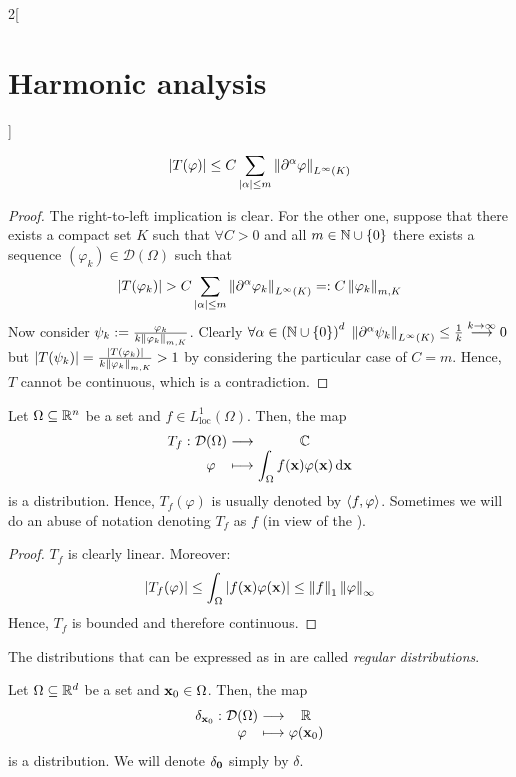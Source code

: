\documentclass[../../../main_math.tex]{subfiles}
\begin{document}
\begin{multicols}{2}[\section{Harmonic analysis}]
\begin{proposition}
    $$\abs{T(\varphi)}\leq C\sum_{\abs{\alpha}\leq m}\left\|\partial^\alpha\varphi\right\|_{L^\infty(K)}$$
  \end{proposition}
  \begin{proof}
    The right-to-left implication is clear. For the other one, suppose that there exists a compact set $K$ such that $\forall C>0$ and all $m\in\mathbb{N}\cup\{0\}$ there exists a sequence $(\varphi_k)\in\mathcal{D}(\Omega)$ such that
    $$\abs{T(\varphi_k)}> C\sum_{\abs{\alpha}\leq m}\left\|\partial^\alpha\varphi_k\right\|_{L^\infty(K)}=:C\left\|\varphi_k\right\|_{m,K}$$
    Now consider $\psi_k:=\frac{\varphi_k}{k\left\|\varphi_k\right\|_{m,K}}$. Clearly $\forall \alpha\in {(\ensuremath{\mathbb{N}}\cup\{0\})}^d$ $\left\|\partial^\alpha\psi_k\right\|_{L^\infty(K)}\leq\frac{1}{k}\overset{k\to\infty}{\longrightarrow}0$ but $\abs{T(\psi_k)}=\frac{\abs{T(\varphi_k)}}{k\left\|\varphi_k\right\|_{m,K}}>1$ by considering the particular case of $C=m$. Hence, $T$ cannot be continuous, which is a contradiction.
  \end{proof}
  \begin{proposition}
    Let $\Omega\subseteq \mathbb{R}^n$ be a set and $f\in L_{\mathrm{loc}}^1(\Omega)$. Then, the map
    \begin{equation}\label{HA:regularDistribution}
      \function{T_f}{\mathcal{D}(\Omega)}{\CC}{\varphi}{\displaystyle\int_\Omega f(\vf{x})\varphi(\vf{x})\dd{\vf{x}}}
    \end{equation}
    is a distribution. Hence, $T_f(\varphi)$ is usually denoted by ${\left\langle f,\varphi\right\rangle}$. Sometimes we will do an abuse of notation denoting $T_f$ as $f$ (in view of the ).
  \end{proposition}
  \begin{proof}
    $T_f$ is clearly linear. Moreover: $$\abs{T_f(\varphi)}\leq\int_\Omega\abs{f(\boldsymbol{\mathrm{x}})\varphi(\boldsymbol{\mathrm{x}})}\leq \left\|f\right\|_1\left\|\varphi\right\|_\infty$$
    Hence, $T_f$ is bounded and therefore continuous.
  \end{proof}
  \begin{definition}
    The distributions that can be expressed as in  are called \emph{regular distributions}.
  \end{definition}
  \begin{proposition}
    Let $\Omega\subseteq \mathbb{R}^d$ be a set and $\boldsymbol{\mathrm{x}}_0\in\Omega$. Then, the map
    $$
      \function{\delta_{\vf{x}_0}}{\mathcal{D}(\Omega)}{\RR}{\varphi}{\varphi(\vf{x}_0)}
    $$
    is a distribution. We will denote $\delta_{\boldsymbol{\mathrm{0}}}$ simply by $\delta$.

\end{proposition}
\end{multicols}
\end{document}
